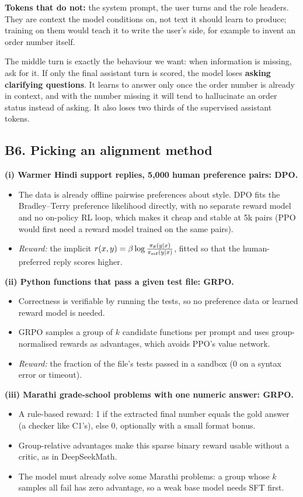 \textbf{Tokens that do not:} the system prompt, the user turns and the role headers. They are context the model conditions on, not text it should learn to produce; training on them would teach it to write the user's side, for example to invent an order number itself.

The middle turn is exactly the behaviour we want: when information is missing, ask for it. If only the final assistant turn is scored, the model loses \textbf{asking clarifying questions}. It learns to answer only once the order number is already in context, and with the number missing it will tend to hallucinate an order status instead of asking. It also loses two thirds of the supervised assistant tokens.

\subsection*{B6. Picking an alignment method}
\textbf{(i) Warmer Hindi support replies, 5,000 human preference pairs: DPO.}
\begin{itemize}[leftmargin=*,nosep]
\item The data is already offline pairwise preferences about style. DPO fits the Bradley--Terry preference likelihood directly, with no separate reward model and no on-policy RL loop, which makes it cheap and stable at 5k pairs (PPO would first need a reward model trained on the same pairs).
\item \emph{Reward:} the implicit $r(x,y)=\beta\log\frac{\pi_\theta(y\mid x)}{\pi_{\rm ref}(y\mid x)}$, fitted so that the human-preferred reply scores higher.
\end{itemize}
\textbf{(ii) Python functions that pass a given test file: GRPO.}
\begin{itemize}[leftmargin=*,nosep]
\item Correctness is verifiable by running the tests, so no preference data or learned reward model is needed.
\item GRPO samples a group of $k$ candidate functions per prompt and uses group-normalised rewards as advantages, which avoids PPO's value network.
\item \emph{Reward:} the fraction of the file's tests passed in a sandbox (0 on a syntax error or timeout).
\end{itemize}
\textbf{(iii) Marathi grade-school problems with one numeric answer: GRPO.}
\begin{itemize}[leftmargin=*,nosep]
\item A rule-based reward: 1 if the extracted final number equals the gold answer (a checker like C1's), else 0, optionally with a small format bonus.
\item Group-relative advantages make this sparse binary reward usable without a critic, as in DeepSeekMath.
\item The model must already solve some Marathi problems: a group whose $k$ samples all fail has zero advantage, so a weak base model needs SFT first.
\end{itemize}
